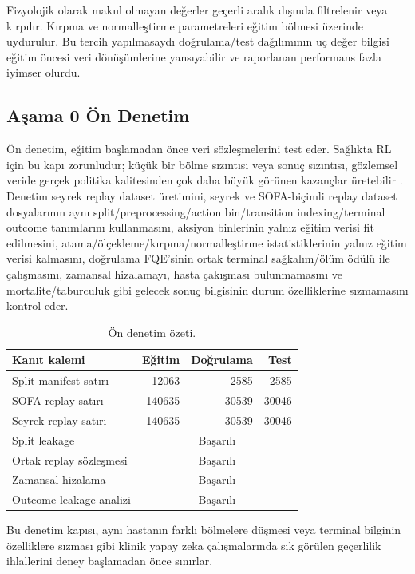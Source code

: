 \documentclass[conference]{IEEEtran}
\begin{document}
Fizyolojik olarak makul olmayan değerler geçerli aralık dışında filtrelenir veya kırpılır. Kırpma ve normalleştirme parametreleri eğitim bölmesi üzerinde uydurulur. Bu tercih yapılmasaydı doğrulama/test dağılımının uç değer bilgisi eğitim öncesi veri dönüşümlerine yansıyabilir ve raporlanan performans fazla iyimser olurdu.

\subsection{Aşama 0 Ön Denetim}
Ön denetim, eğitim başlamadan önce veri sözleşmelerini test eder. Sağlıkta RL için bu kapı zorunludur; küçük bir bölme sızıntısı veya sonuç sızıntısı, gözlemsel veride gerçek politika kalitesinden çok daha büyük görünen kazançlar üretebilir \cite{gottesman2019guidelines}. Denetim seyrek replay dataset üretimini, seyrek ve SOFA-biçimli replay dataset dosyalarının aynı split/preprocessing/action bin/transition indexing/terminal outcome tanımlarını kullanmasını, aksiyon binlerinin yalnız eğitim verisi fit edilmesini, atama/ölçekleme/kırpma/normalleştirme istatistiklerinin yalnız eğitim verisi kalmasını, doğrulama FQE'sinin ortak terminal sağkalım/ölüm ödülü ile çalışmasını, zamansal hizalamayı, hasta çakışması bulunmamasını ve mortalite/taburculuk gibi gelecek sonuç bilgisinin durum özelliklerine sızmamasını kontrol eder.

\begin{table}[t]
\centering
\caption{Ön denetim özeti.}
\label{tab:audit}
\begin{tabular}{lrrr}
\toprule
Kanıt kalemi & Eğitim & Doğrulama & Test \\
\midrule
Split manifest satırı & 12063 & 2585 & 2585 \\
SOFA replay satırı & 140635 & 30539 & 30046 \\
Seyrek replay satırı & 140635 & 30539 & 30046 \\
\midrule
Split leakage & \multicolumn{3}{c}{Başarılı} \\
Ortak replay sözleşmesi & \multicolumn{3}{c}{Başarılı} \\
Zamansal hizalama & \multicolumn{3}{c}{Başarılı} \\
Outcome leakage analizi & \multicolumn{3}{c}{Başarılı} \\
\bottomrule
\end{tabular}
\end{table}

Bu denetim kapısı, aynı hastanın farklı bölmelere düşmesi veya terminal bilginin özelliklere sızması gibi klinik yapay zeka çalışmalarında sık görülen geçerlilik ihlallerini deney başlamadan önce sınırlar.
\end{document}
